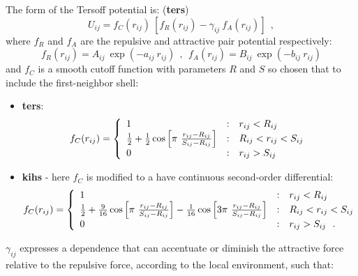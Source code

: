 The form of the Tersoff potential is:  ({\bf ters})
\begin{equation}
U_{ij} = f_{C}(r_{ij})~[f_{R}(r_{ij}) - \gamma_{ij}~f_{A}(r_{ij})]~~,
\end{equation}
where $f_{R}$ and $f_{A}$ are the repulsive and attractive pair
potential respectively:
\begin{equation}
f_{R}(r_{ij}) = A_{ij}~\exp(- a_{ij}~r_{ij})~~,~~
f_{A}(r_{ij}) = B_{ij}~\exp(- b_{ij}~r_{ij})
\end{equation}
and $f_{C}$ is a smooth cutoff function with parameters $R$ and $S$
so chosen that to include the first-neighbor shell:
\begin{itemize}
\item {\bf ters}:
\begin{equation}
f_{C}(r_{ij}) = \left\{ \begin{array} {l@{\quad:\quad}l}
1 & r_{ij} < R_{ij} \\
\frac{1}{2} + \frac{1}{2} \cos \left[\pi~\frac{r_{ij}-R_{ij}}{S_{ij}-R_{ij}}\right]
& R_{ij} < r_{ij} < S_{ij} \\
0 & r_{ij} > S_{ij}
\end{array} \right.
\end{equation}
\item {\bf kihs} - here $f_{C}$ is modified to a have continuous second-order
differential:
\begin{equation}
f_{C}(r_{ij}) = \left\{ \begin{array} {l@{\quad:\quad}l}
1 & r_{ij} < R_{ij} \\
\frac{1}{2} + \frac{9}{16} \cos \left[\pi~\frac{r_{ij}-R_{ij}}{S_{ij}-R_{ij}}\right]
- \frac{1}{16} \cos \left[3 \pi~\frac{r_{ij}-R_{ij}}{S_{ij}-R_{ij}}\right]
& R_{ij} < r_{ij} < S_{ij} \\
0 & r_{ij} > S_{ij}~~.
\end{array} \right.
\end{equation}
\end{itemize}
$\gamma_{ij}$ expresses a dependence that can accentuate or diminish
the attractive force relative to the repulsive force, according to
the local environment, such that:
